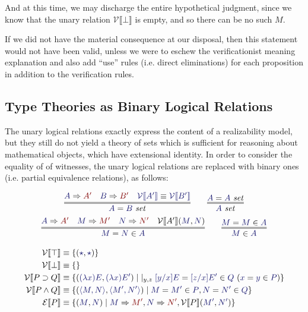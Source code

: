 \documentclass[11pt]{amsart}
\theoremstyle{definition}
\theoremstyle{remark}
\numberwithin{equation}{section}
\def\InputModeColorName{MidnightBlue}
\def\OutputModeColorName{Maroon}
\newcommand\InputMode[1]{{\color{\InputModeColorName}{#1}}}
\newcommand\OutputMode[1]{{\color{\OutputModeColorName}{#1}}}
\newcommand\HypJ[2]{#1\ (#2)}
\newcommand\GenJ[2]{\vert_{#1}\; #2}
\newcommand\IsSet[1]{\InputMode{#1}\ \mathit{set}}
\newcommand\EqSet[2]{\InputMode{#1}=\InputMode{#2}\ \mathit{set}}
\newcommand\Member[2]{\InputMode{#1}\in \InputMode{#2}}
\newcommand\EqMember[3]{\InputMode{#1}=\InputMode{#2}\in \InputMode{#3}}
\newcommand\Eval[2]{\InputMode{#1}\Rightarrow \OutputMode{#2}}
\newcommand\SEM[1]{\llbracket#1 \rrbracket}
\newcommand\VAL[1]{\mathcal{V}\SEM{#1}}
\newcommand\EXP[1]{\mathcal{E}\SEM{#1}}
\newcommand\True{\top}
\newcommand\False{\bot}
\newcommand\Imp[2]{#1\supset #2}
\newcommand\Conj[2]{#1\land #2}
\newcommand\It{\star}
\newcommand\Lam[2]{(\lambda #1) #2}
\newcommand\Pair[2]{\langle #1, #2 \rangle}
\begin{document}
And at this time, we may discharge the entire hypothetical judgment, since we
know that the unary relation $\VAL{\False}$ is empty, and so there can be no
such $M$.

If we did not have the material consequence at our disposal, then this statement
would not have been valid, unless we were to eschew the verificationist meaning
explanation and also add ``use'' rules (i.e. direct eliminations) for each
proposition in addition to the verification rules.

\subsection{Type Theories as Binary Logical Relations}

The unary logical relations exactly express the content of a realizability
model, but they still do not yield a theory of sets which is sufficient for
reasoning about mathematical objects, which have extensional identity. In order
to consider the equality of of witnesses, the unary logical relations are
replaced with binary ones (i.e. partial equivalence relations), as follows:

\begin{gather*}
  \infer={
    \EqSet{A}{B}
  }{
    \Eval{A}{A'} &
    \Eval{B}{B'} &
    \InputMode{\VAL{A'}}\equiv\InputMode{\VAL{B'}}
  }\qquad
  \infer={
    \IsSet{A}
  }{
   \EqSet{A}{A}
  }\\
  \infer={
    \EqMember{M}{N}{A}
  }{
    \Eval{A}{A'} &
    \Eval{M}{M'} &
    \Eval{N}{N'} &
    \VAL{A'}(\InputMode{M}, \InputMode{N})
  }\qquad
  \infer={
    \Member{M}{A}
  }{
    \EqMember{M}{M}{A}
  }
\end{gather*}

\begin{align*}
  \VAL{\True} &\equiv \{(\InputMode{\It}, \InputMode{\It})\}\\
  \VAL{\False} &\equiv \{\}\\
  \VAL{\Imp{P}{Q}} &\equiv 
    \{ (\InputMode{\Lam{x}{E}}, \InputMode{\Lam{x}{E'}})
    \mid \GenJ{y,z}{
      \HypJ{\EqMember{[y/x]E}{[z/x]E'}{Q}}{\EqMember{x}{y}{P}}
    }
    \}\\
  \VAL{\Conj{P}{Q}} &\equiv
    \{ (\InputMode{\Pair{M}{N}}, \InputMode{\Pair{M'}{N'}})
    \mid \EqMember{M}{M'}{P}, \EqMember{N}{N'}{Q}
    \}\\
  \EXP{P} &\equiv
    \{ (\InputMode{M}, \InputMode{N})
    \mid \Eval{M}{M'}, \Eval{N}{N'}, \VAL{P}(\InputMode{M'}, \InputMode{N'})
    \}
\end{align*}
\end{document}
